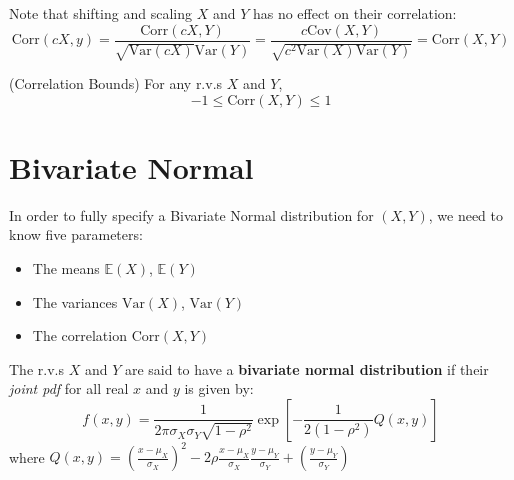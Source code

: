\documentclass{article}
\begin{document}
\begin{theorem}
    Note that shifting and scaling $X$ and $Y$ has no effect on their correlation: \begin{equation*}
        \text{Corr}(cX,y) = \frac{\text{Corr}(cX,Y)}{\sqrt{\text{Var}(cX)}\text{Var}(Y)} = \frac{c \text{Cov}(X,Y)}{\sqrt{c^{2}\text{Var}(X) \text{Var}(Y)}} = \text{Corr}(X,Y)
    \end{equation*}
\end{theorem}

\begin{theorem}
    (Correlation Bounds) For any r.v.s $X$ and $Y$, \begin{equation*}
        -1 \leq \text{Corr}(X,Y) \leq 1
    \end{equation*}
\end{theorem}

\section{Bivariate Normal}

In order to fully specify a Bivariate Normal distribution for $(X,Y)$, we need to know five parameters: \begin{itemize}
    \item The means $\mathbb{E}(X)$, $\mathbb{E}(Y)$
    \item The variances $\text{Var}(X)$, $\text{Var}(Y)$
    \item The correlation $\text{Corr}(X,Y)$
\end{itemize}

\begin{definition}
    The r.v.s $X$ and $Y$ are said to have a \textbf{bivariate normal distribution} if their \textit{joint pdf} for all real $x$ and $y$ is given by: \begin{equation}
        f(x,y) = \frac{1}{2\pi \sigma_X \sigma_Y \sqrt{1-\rho^{2}}}\exp\left[-\frac{1}{2(1-\rho^{2})}Q(x,y)\right]
    \end{equation}
    \noindent where $\displaystyle Q(x,y) = \left( \frac{x - \mu_X}{\sigma_X}\right)^{2} - 2\rho \frac{x - \mu_X}{\sigma_X} \frac{y - \mu_Y}{\sigma_Y} + \left( \frac{y - \mu_Y}{\sigma_Y}\right)$
\end{definition}
\end{document}
